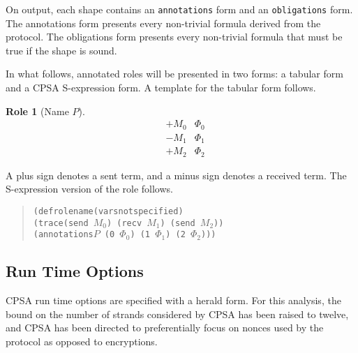 \documentclass[titlepage,12pt]{article}
\theoremstyle{definition}
\newtheorem{role}{Role}
\newcommand{\inbnd}{\mathord -}
\newcommand{\outbnd}{\mathord +}
\begin{document}
On output, each shape contains an \texttt{annotations} form and an
\texttt{obligations} form. The annotations form presents every
non-trivial formula derived from the protocol. The obligations form
presents every non-trivial formula that must be true if the shape is
sound.

In what follows, annotated roles will be presented in two forms: a
tabular form and a CPSA S-expression form.  A template for the
tabular form follows.

\setcounter{role}{-1}
\begin{role}[Name $P$]
\begin{eqnarray*}
&\outbnd M_0&\Phi_0\\
&\inbnd M_1&\Phi_1\\
&\outbnd M_2&\Phi_2
\end{eqnarray*}
\end{role}

A plus sign denotes a sent term, and a minus sign denotes a received
term.  The S-expression version of the role follows.

\begin{quote}
\newcommand{\trace}{\texttt{(send $M_0$) (recv $M_1$) (send $M_2$)}}
\newcommand{\annos}{\texttt{$P$ (0 $\Phi_0$) (1 $\Phi_1$) (2 $\Phi_2$)}}
\begin{alltt}
(defrole name (vars \textrm{not specified})
\quad (trace \trace)
\quad (annotations \annos))
\end{alltt}
\end{quote}

\subsection{Run Time Options}

CPSA run time options are specified with a herald form.  For this
analysis, the bound on the number of strands considered by CPSA has
been raised to twelve, and CPSA has been directed to preferentially
focus on nonces used by the protocol as opposed to encryptions.
\end{document}
